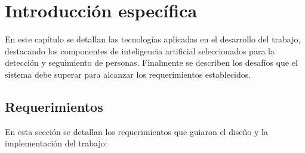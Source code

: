 \chapter{Introducción específica} %

\label{Chapter2}

En este capítulo se detallan las tecnologías aplicadas en el desarrollo del trabajo, destacando los componentes de inteligencia artificial seleccionados para la detección y seguimiento de personas. Finalmente se describen los desafíos que el sistema debe superar para alcanzar los requerimientos establecidos.


\section{Requerimientos}
\label{sec:requerimientos}

En esta sección se detallan los requerimientos que guiaron el diseño y la implementación del trabajo:

